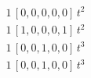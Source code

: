 \begin{align*}
1\,[0,0,0,0,0]\,t^{2} \\
1\,[1,0,0,0,1]\,t^{2} \\
1\,[0,0,1,0,0]\,t^{3} \\
1\,[0,0,1,0,0]\,t^{3}
\end{align*}
